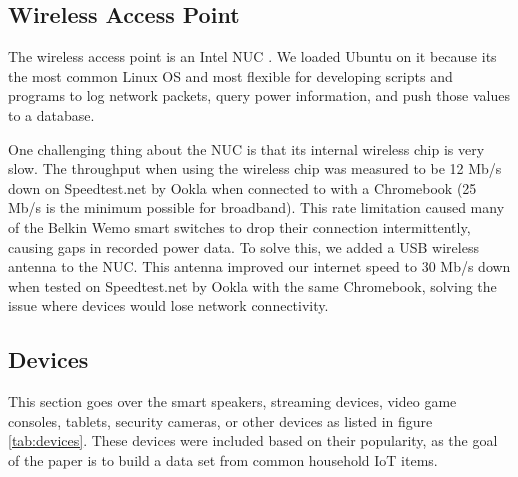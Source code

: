 \subsection{Wireless Access Point}
\label{Wireless Access Point}
The wireless access point is an Intel NUC \cite{nuc}. We loaded Ubuntu\cite{ubuntu} on it because its the most common Linux OS \cite{linux} and most flexible for developing scripts and programs to log network packets, query power information, and push those values to a database.

One challenging thing about the NUC is that its internal wireless chip is very slow. The throughput when using the wireless chip was measured to be 12 Mb/s down on Speedtest.net by Ookla \cite{speedtest} when connected to with a Chromebook \cite{chromebook} (25 Mb/s is the minimum possible for broadband). This rate limitation caused many of the Belkin Wemo smart switches \cite{wemo} to drop their connection intermittently, causing gaps in recorded power data. To solve this, we added a USB wireless antenna to the NUC. This antenna improved our internet speed to 30 Mb/s down when tested on Speedtest.net by Ookla with the same Chromebook, solving the issue where devices would lose network connectivity.

\subsection{Devices}
\label{Devices}
This section goes over the smart speakers, streaming devices, video game consoles, tablets, security cameras, or other devices as listed in figure \ref{tab:devices}. These devices were included based on their popularity, as the goal of the paper is to build a data set from common household IoT items.

